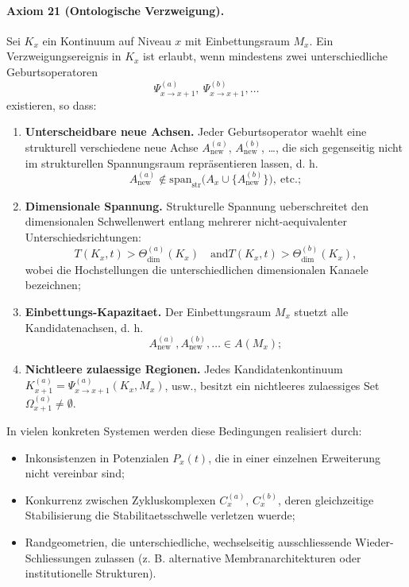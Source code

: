 \paragraph{Axiom 21 (Ontologische Verzweigung).}
Sei \(K_x\) ein Kontinuum auf Niveau \(x\) mit Einbettungsraum \(M_x\). Ein
Verzweigungsereignis in \(K_x\) ist erlaubt, wenn mindestens zwei unterschiedliche
Geburtsoperatoren
\[
  \Psi_{x\to x+1}^{(a)},\ \Psi_{x\to x+1}^{(b)},\dots
\]
existieren, so dass:
\begin{enumerate}
  \item \textbf{Unterscheidbare neue Achsen.}\quad
        Jeder Geburtsoperator waehlt eine strukturell verschiedene neue Achse
        \(A_{\mathrm{new}}^{(a)}\), \(A_{\mathrm{new}}^{(b)}\), \dots,
        die sich gegenseitig nicht im strukturellen Spannungsraum repräsentieren
        lassen, d. h.
        \[
          A_{\mathrm{new}}^{(a)} \notin \mathrm{span}_{\mathrm{str}}
            \big(A_x \cup \{A_{\mathrm{new}}^{(b)}\}\big), \ \text{etc.};
        \]
  \item \textbf{Dimensionale Spannung.}\quad
        Strukturelle Spannung ueberschreitet den dimensionalen Schwellenwert entlang
        mehrerer nicht-aequivalenter Unterschiedsrichtungen:
        \[
          T(K_x,t) > \Theta_{\mathrm{dim}}^{(a)}(K_x)
          \quad\text{and}
          T(K_x,t) > \Theta_{\mathrm{dim}}^{(b)}(K_x),
        \]
        wobei die Hochstellungen die unterschiedlichen dimensionalen Kanaele bezeichnen;
  \item \textbf{Einbettungs-Kapazitaet.}\quad
        Der Einbettungsraum \(M_x\) stuetzt alle Kandidatenachsen, d. h.
        \[
          A_{\mathrm{new}}^{(a)}, A_{\mathrm{new}}^{(b)}, \dots
          \in A(M_x);
        \]
  \item \textbf{Nichtleere zulaessige Regionen.}\quad
        Jedes Kandidatenkontinuum
        \(K_{x+1}^{(a)} = \Psi_{x\to x+1}^{(a)}(K_x, M_x)\), usw., besitzt ein
        nichtleeres zulaessiges Set \(\Omega_{x+1}^{(a)}\neq\emptyset\).
\end{enumerate}

In vielen konkreten Systemen werden diese Bedingungen realisiert durch:
\begin{itemize}
  \item Inkonsistenzen in Potenzialen \(P_x(t)\), die in einer einzelnen
        Erweiterung nicht vereinbar sind;
  \item Konkurrenz zwischen Zykluskomplexen \(C_x^{(a)}\), \(C_x^{(b)}\), deren
        gleichzeitige Stabilisierung die Stabilitaetsschwelle verletzen wuerde;
  \item Randgeometrien, die unterschiedliche, wechselseitig ausschliessende
        Wieder-Schliessungen zulassen (z. B. alternative Membranarchitekturen
        oder institutionelle Strukturen).
\end{itemize}

